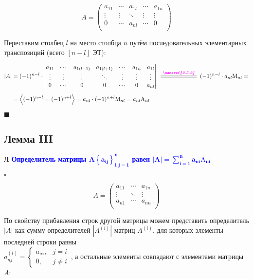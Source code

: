 \documentclass[12pt, a4paper]{report}
\newcommand{\sqbox}{%
	\collectbox{%
		\setlength{\fboxsep}{2pt}%
		\fbox{\BOXCONTENT}%
	}%
}
\newcommand{\lm}[1][]{\begin{flushleft}\textbf{\sqbox{Л} \textcolor{Blue}{#1}}\end{flushleft}}
\newcommand{\oversymbol}[2]{\overset{\textcolor{MMagenta}{\textbf{\textit{#1}}}}{\resizebox{\widthof{#1}}{\heightof{\(#2\)}}{\(#2\)}}}
\begin{document}
	\[
		A = \begin{pmatrix}
				a_{11}&\cdots&a_{1l}&\cdots&a_{1n}\\
				\vdots&\vdots&\ddots&\vdots&\vdots\\
				0&\cdots&a_{nl}&\cdots&0\\
			\end{pmatrix}
	\]
	
	\smallskip
	Переставим столбец \(l\) на место столбца \(n\) путём последовательных элементарных транспозиций (всего \([n-l]\) ЭТ):
	
	\begin{align*}
		|A|&=(-1)^{n-l}\cdot\begin{vmatrix}
								a_{11}&\cdots&a_{1(l-1)}&a_{1(l+1)}&\cdots&a_{1n}&a_{1l}\\
								\vdots&\vdots&\vdots&\ddots&\vdots&\vdots&\vdots\\
								0&\cdots&0&0&\cdots&0&a_{nl}\\
							\end{vmatrix}
		\oversymbol{\nameref{2.5.2}}{=}(-1)^{n-l}\cdot a_{nl}\mathrm{M}_{nl}=\\[5pt]
		&=\Big\langle(-1)^{n-l}=(-1)^{n+l}\Big\rangle=a_{nl}\cdot (-1)^{n+l}\mathrm{M}_{nl}=a_{nl}\mathrm{A}_{nl}
	\end{align*}
	
	\(\blacksquare\)
	\subsection{Лемма III}\label{2.5.4}
	
	\lm[Определитель матрицы \(\boldsymbol{A\left\{a_{ij}\right\}_{i,j=1}^{n}}\) равен \(\displaystyle\boldsymbol{ |A|=\sum_{i=1}^{n}a_{ni}\mathrm{A}_{ni}}\)]
	
	\(\square\)
	
	\[
		A=\begin{pmatrix}a_{11}&\cdots&a_{1n}\\
						\vdots&\ddots&\vdots\\
						a_{n1}&\cdots&a_{nn}\\
		\end{pmatrix}
	\]
	
	\smallskip
	По свойству прибавления строк другой матрицы можем представить определитель \(|A|\) как сумму определителей \(\left|A^{(i)}\right|\) матриц \(A^{(i)}\), для которых элементы последней строки равны\\ \(a_{nj}^{(i)}=\begin{cases}a_{ni},&j=i\\0,&j\neq i\end{cases}\)\,, а остальные элементы совпадают с элементами матрицы \(A\):
	
\end{document}
